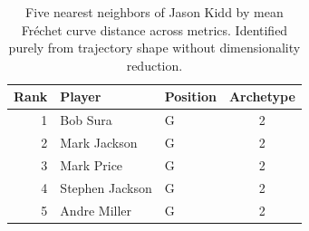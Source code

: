 \begin{table}[htbp]
  \centering\small
  \begin{tabular}{rllc}
    \toprule
    Rank & Player & Position & Archetype \\
    \midrule
    1 & Bob Sura & G & 2 \\
    2 & Mark Jackson & G & 2 \\
    3 & Mark Price & G & 2 \\
    4 & Stephen Jackson & G & 2 \\
    5 & Andre Miller & G & 2 \\
    \bottomrule
  \end{tabular}
  \caption{Five nearest neighbors of Jason Kidd by mean Fr\'{e}chet curve distance across metrics. Identified purely from trajectory shape without dimensionality reduction.}
  \label{tab:Jason_Kidd_frechet_curve_neighbors}
\end{table}

